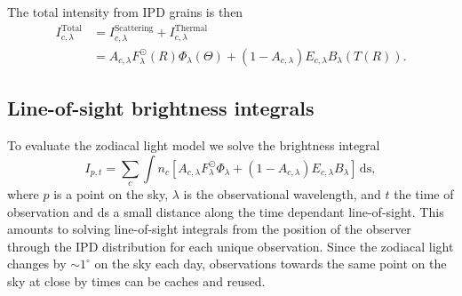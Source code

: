 \documentclass{aa}
\begin{document}
The total intensity from IPD grains is then
\begin{align}
    I^\mathrm{Total}_{c, \lambda} &= I^\mathrm{Scattering}_{c,\lambda} + I^\mathrm{Thermal}_{c,\lambda}\\
    &= A_{c, \lambda} F_\lambda^\odot(R) \Phi_\lambda(\Theta) + \left( 1 - A_{c, \lambda} \right) E_{c,\lambda} B_\lambda(T(R)).
\end{align}

\subsection{Line-of-sight brightness integrals}
To evaluate the zodiacal light model we solve the brightness integral
\begin{equation}
    I_{p,t} = \sum_c \int n_c \left[  A_{c, \lambda} F_\lambda^\odot \Phi_\lambda + \left( 1 - A_{c, \lambda} \right) E_{c,\lambda} B_\lambda \right]\,\mathrm {ds},
\end{equation}
where $p$ is a point on the sky, $\lambda$ is the observational wavelength, and $t$ the time of observation and ds a small distance along the time dependant line-of-sight. This amounts to solving line-of-sight integrals from the position of the observer through the IPD distribution for each unique observation. Since the zodiacal light changes by $\sim 1^\circ$ on the sky each day, observations towards the same point on the sky at close by times can be caches and reused.
\end{document}
